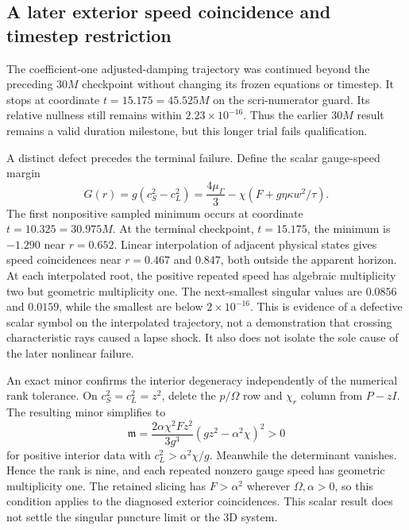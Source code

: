 \documentclass[11pt]{article}
\begin{document}
\subsection{A later exterior speed coincidence and timestep restriction}
The coefficient-one adjusted-damping trajectory was continued beyond the preceding $30M$ checkpoint without changing its frozen equations or timestep. It stops at coordinate $t=15.175=45.525M$ on the scri-numerator guard. Its relative nullness still remains within $2.23\times10^{-16}$. Thus the earlier $30M$ result remains a valid duration milestone, but this longer trial fails qualification.

A distinct defect precedes the terminal failure. Define the scalar gauge-speed margin
\begin{equation}
 G(r)=g(c_S^2-c_L^2)=\frac{4\mu_\Gamma}{3}
       -\chi\left(F+g\eta\kappa w^2/\tau\right).
\end{equation}
The first nonpositive sampled minimum occurs at coordinate $t=10.325=30.975M$. At the terminal checkpoint, $t=15.175$, the minimum is $-1.290$ near $r=0.652$. Linear interpolation of adjacent physical states gives speed coincidences near $r=0.467$ and $0.847$, both outside the apparent horizon. At each interpolated root, the positive repeated speed has algebraic multiplicity two but geometric multiplicity one. The next-smallest singular values are $0.0856$ and $0.0159$, while the smallest are below $2\times10^{-16}$. This is evidence of a defective scalar symbol on the interpolated trajectory, not a demonstration that crossing characteristic rays caused a lapse shock. It also does not isolate the sole cause of the later nonlinear failure.

An exact minor confirms the interior degeneracy independently of the numerical rank tolerance. On $c_S^2=c_L^2=z^2$, delete the $p/\Omega$ row and $\chi_r$ column from $P-zI$. The resulting minor simplifies to
\begin{equation}
 \mathfrak m=\frac{2\alpha\chi^2Fz^2}{3g^3}
                 (gz^2-\alpha^2\chi)^2>0
\end{equation}
for positive interior data with $c_L^2>\alpha^2\chi/g$. Meanwhile the determinant vanishes. Hence the rank is nine, and each repeated nonzero gauge speed has geometric multiplicity one. The retained slicing has $F>\alpha^2$ wherever $\Omega,\alpha>0$, so this condition applies to the diagnosed exterior coincidences. This scalar result does not settle the singular puncture limit or the 3D system.
\end{document}
